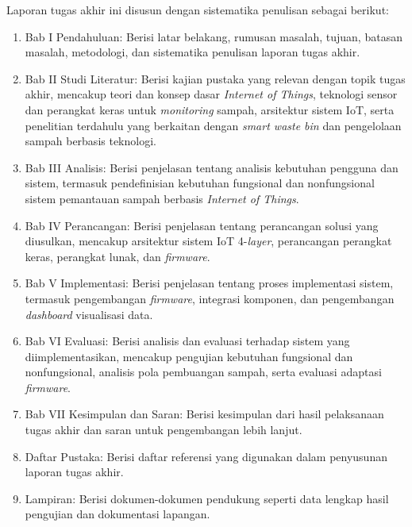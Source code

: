 Laporan tugas akhir ini disusun dengan sistematika penulisan sebagai berikut:

\begin{enumerate}
    \item Bab I Pendahuluan: Berisi latar belakang, rumusan masalah, tujuan, batasan masalah, metodologi, dan sistematika penulisan laporan tugas akhir.

    \item Bab II Studi Literatur: Berisi kajian pustaka yang relevan dengan topik tugas akhir, mencakup teori dan konsep dasar \textit{Internet of Things}, teknologi sensor dan perangkat keras untuk \textit{monitoring} sampah, arsitektur sistem IoT, serta penelitian terdahulu yang berkaitan dengan \textit{smart waste bin} dan pengelolaan sampah berbasis teknologi.

    \item Bab III Analisis: Berisi penjelasan tentang analisis kebutuhan pengguna dan sistem, termasuk pendefinisian kebutuhan fungsional dan nonfungsional sistem pemantauan sampah berbasis \textit{Internet of Things}.

    \item Bab IV Perancangan: Berisi penjelasan tentang perancangan solusi yang diusulkan, mencakup arsitektur sistem IoT 4-\textit{layer}, perancangan perangkat keras, perangkat lunak, dan \textit{firmware}.

    \item Bab V Implementasi: Berisi penjelasan tentang proses implementasi sistem, termasuk pengembangan \textit{firmware}, integrasi komponen, dan pengembangan \textit{dashboard} visualisasi data.

    \item Bab VI Evaluasi: Berisi analisis dan evaluasi terhadap sistem yang diimplementasikan, mencakup pengujian kebutuhan fungsional dan nonfungsional, analisis pola pembuangan sampah, serta evaluasi adaptasi \textit{firmware}.

    \item Bab VII Kesimpulan dan Saran: Berisi kesimpulan dari hasil pelaksanaan tugas akhir dan saran untuk pengembangan lebih lanjut.

    \item Daftar Pustaka: Berisi daftar referensi yang digunakan dalam penyusunan laporan tugas akhir.

    \item Lampiran: Berisi dokumen-dokumen pendukung seperti data lengkap hasil pengujian dan dokumentasi lapangan.
\end{enumerate}